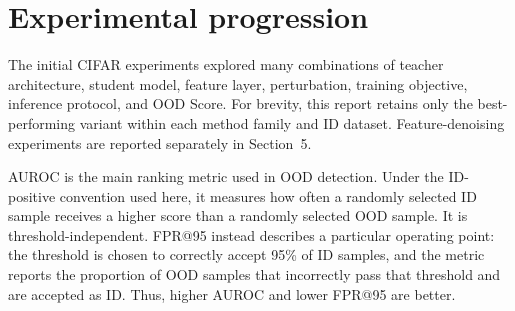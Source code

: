 \section{Experimental progression}

\headingindent
The initial CIFAR experiments explored many combinations of teacher
architecture, student model, feature layer, perturbation, training objective,
inference protocol, and OOD Score. For brevity, this report retains only the
best-performing variant within each method family and ID dataset.
Feature-denoising experiments are reported separately in Section~5.

AUROC is the main ranking metric used in OOD detection. Under the
ID-positive convention used here, it measures how often a randomly selected ID
sample receives a higher score than a randomly selected OOD sample. It is
threshold-independent. FPR@95 instead describes a particular operating point:
the threshold is chosen to correctly accept 95\% of ID samples, and the metric
reports the proportion of OOD samples that incorrectly pass that threshold and
are accepted as ID. Thus, higher AUROC and lower FPR@95 are better.



